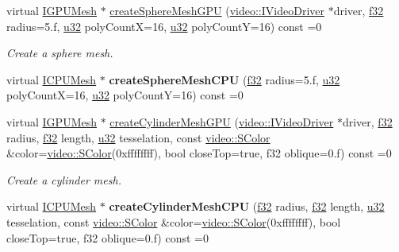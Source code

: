 \begin{DoxyCompactItemize}
\item 
virtual \hyperlink{classirr_1_1scene_1_1IMesh}{I\+G\+P\+U\+Mesh} $\ast$ \hyperlink{classirr_1_1scene_1_1IGeometryCreator_abdea997960c37f721892203312dcadbd}{create\+Sphere\+Mesh\+G\+PU} (\hyperlink{classirr_1_1video_1_1IVideoDriver}{video\+::\+I\+Video\+Driver} $\ast$driver, \hyperlink{namespaceirr_a0277be98d67dc26ff93b1a6a1d086b07}{f32} radius=5.f, \hyperlink{namespaceirr_a0416a53257075833e7002efd0a18e804}{u32} poly\+CountX=16, \hyperlink{namespaceirr_a0416a53257075833e7002efd0a18e804}{u32} poly\+CountY=16) const  =0
\begin{DoxyCompactList}\small\item\em Create a sphere mesh. \end{DoxyCompactList}\item 
virtual \hyperlink{classirr_1_1scene_1_1IMesh}{I\+C\+P\+U\+Mesh} $\ast$ {\bfseries create\+Sphere\+Mesh\+C\+PU} (\hyperlink{namespaceirr_a0277be98d67dc26ff93b1a6a1d086b07}{f32} radius=5.f, \hyperlink{namespaceirr_a0416a53257075833e7002efd0a18e804}{u32} poly\+CountX=16, \hyperlink{namespaceirr_a0416a53257075833e7002efd0a18e804}{u32} poly\+CountY=16) const  =0\hypertarget{classirr_1_1scene_1_1IGeometryCreator_a4302454584a0fb49e2be465d191fe79d}{}\label{classirr_1_1scene_1_1IGeometryCreator_a4302454584a0fb49e2be465d191fe79d}

\item 
virtual \hyperlink{classirr_1_1scene_1_1IMesh}{I\+G\+P\+U\+Mesh} $\ast$ \hyperlink{classirr_1_1scene_1_1IGeometryCreator_a407144cf0d15dcac00cdbf32478cb62b}{create\+Cylinder\+Mesh\+G\+PU} (\hyperlink{classirr_1_1video_1_1IVideoDriver}{video\+::\+I\+Video\+Driver} $\ast$driver, \hyperlink{namespaceirr_a0277be98d67dc26ff93b1a6a1d086b07}{f32} radius, \hyperlink{namespaceirr_a0277be98d67dc26ff93b1a6a1d086b07}{f32} length, \hyperlink{namespaceirr_a0416a53257075833e7002efd0a18e804}{u32} tesselation, const \hyperlink{classirr_1_1video_1_1SColor}{video\+::\+S\+Color} \&color=\hyperlink{classirr_1_1video_1_1SColor}{video\+::\+S\+Color}(0xffffffff), bool close\+Top=true, f32 oblique=0.\+f) const  =0
\begin{DoxyCompactList}\small\item\em Create a cylinder mesh. \end{DoxyCompactList}\item 
virtual \hyperlink{classirr_1_1scene_1_1IMesh}{I\+C\+P\+U\+Mesh} $\ast$ {\bfseries create\+Cylinder\+Mesh\+C\+PU} (\hyperlink{namespaceirr_a0277be98d67dc26ff93b1a6a1d086b07}{f32} radius, \hyperlink{namespaceirr_a0277be98d67dc26ff93b1a6a1d086b07}{f32} length, \hyperlink{namespaceirr_a0416a53257075833e7002efd0a18e804}{u32} tesselation, const \hyperlink{classirr_1_1video_1_1SColor}{video\+::\+S\+Color} \&color=\hyperlink{classirr_1_1video_1_1SColor}{video\+::\+S\+Color}(0xffffffff), bool close\+Top=true, f32 oblique=0.\+f) const  =0\hypertarget{classirr_1_1scene_1_1IGeometryCreator_a16fa2473091b8b5b8c11e4c8a67eccb4}{}\label{classirr_1_1scene_1_1IGeometryCreator_a16fa2473091b8b5b8c11e4c8a67eccb4}


\end{DoxyCompactItemize}
